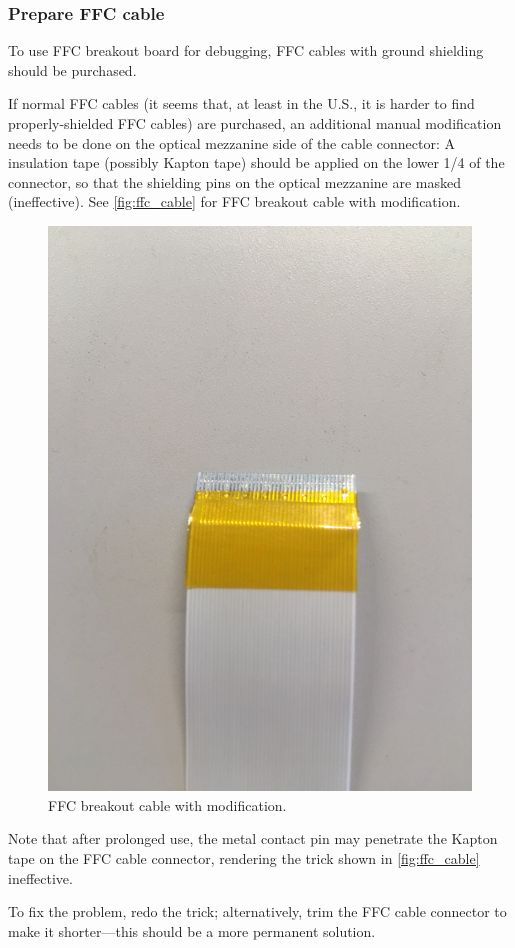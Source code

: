 \subsubsection{Prepare FFC cable}
To use FFC breakout board for debugging, FFC cables with ground shielding should
be purchased.

If normal FFC cables (it seems that, at least in the U.S., it is harder to find
properly-shielded FFC cables) are purchased, an additional manual modification
needs to be done on the optical mezzanine side of the cable connector:
A insulation tape (possibly Kapton tape) should be applied on the lower 1/4 of
the connector, so that the shielding pins on the optical mezzanine are masked
(ineffective).
See \autoref{fig:ffc_cable} for FFC breakout cable with modification.

\begin{figure}[!ht]
    \centering
    \includegraphics[width=0.9\linewidth]{res/ffc_breakout_cable_with_tape.jpg}
    \caption{FFC breakout cable with modification.}
    \label{fig:ffc_cable}
\end{figure}

\begin{leftbar}
    Note that after prolonged use, the metal contact pin may penetrate the
    Kapton tape on the FFC cable connector, rendering the trick shown in
    \autoref{fig:ffc_cable} ineffective.

    To fix the problem, redo the trick;
    alternatively, trim the FFC cable connector to make it shorter---this should
    be a more permanent solution.
\end{leftbar}
